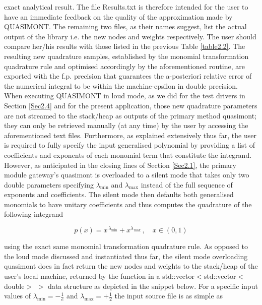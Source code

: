 \documentclass[a4paper, twosided]{book}
\begin{document}
exact analytical result. The file \colorbox{poliGrayBlue}{Results.txt} is therefore intended for the user to have an immediate feedback on the quality of the approximation made by QUASIMONT. The remaining two files, as their names suggest, list the actual output of the library i.e. the new nodes and weights respectively. The user should compare her/his results with those listed in the previous Table \ref{table2.2}. The resulting new quadrature samples, established by the monomial transformation quadrature rule and optimised accordingly by the aforementioned routine, are exported with the f.p. precision that guarantees the a-posteriori relative error of the numerical integral to be within the machine-epsilon in double precision. When executing QUASIMONT in loud mode, as we did for the test drivers in Section \ref{Sec2.4} and for the present application, those new quadrature parameters are not streamed to the stack/heap as outputs of the primary method \colorbox{poliGrayBlue}{quasimont}; they can only be retrieved manually (at any time) by the user by accessing the aforementioned text files. Furthermore, as explained extensively thus far, the user is required to fully specify the input generalised polynomial by providing a list of coefficients and exponents of each monomial term that constitute the integrand. However, as anticipated in the closing lines of Section \ref{Sec2.1}, the primary module gateway's \colorbox{poliGrayBlue}{quasimont} is overloaded to a silent mode that takes only two \colorbox{poliGrayBlue}{double} parameters specifying $\lambda_{\text{min}}$ and $\lambda_{\text{max}}$ instead of the full sequence of exponents and coefficients. The silent mode then defaults both generalised monomials to have unitary coefficients and thus computes the quadrature of the following integrand

\begin{equation*}
    p(x) = x^{\,\lambda_{\text{min}}} + x^{\lambda_{\,\text{max}}}\,,\quad x\in(0,1) 
\end{equation*}

\noindent
using the exact same monomial transformation quadrature rule. As opposed to the loud mode discussed and instantiated thus far, the silent mode overloading \colorbox{poliGrayBlue}{quasimont} does in fact return the new nodes and weights to the stack/heap of the user's local machine, returned by the function in a \colorbox{poliGrayBlue}{std::vector$<$std::vector$<$double$>$ $>$} data structure as depicted in the snippet below. For a specific input values of $\lambda_{\text{min}} = -\frac{1}{e}$ and $\lambda_{\text{max}} = +\frac{1}{2}$ the input source file is as simple as
\end{document}
